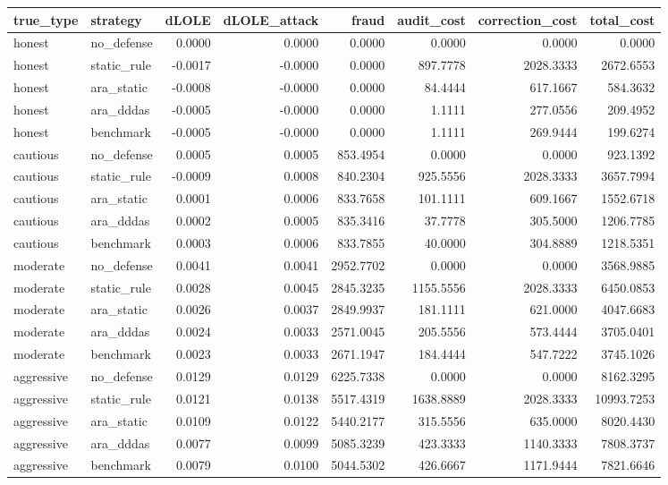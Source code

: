 \begin{tabular}{llrrrrrr}
\toprule
true_type & strategy & dLOLE & dLOLE_attack & fraud & audit_cost & correction_cost & total_cost \\
\midrule
honest & no_defense & 0.0000 & 0.0000 & 0.0000 & 0.0000 & 0.0000 & 0.0000 \\
honest & static_rule & -0.0017 & -0.0000 & 0.0000 & 897.7778 & 2028.3333 & 2672.6553 \\
honest & ara_static & -0.0008 & -0.0000 & 0.0000 & 84.4444 & 617.1667 & 584.3632 \\
honest & ara_dddas & -0.0005 & -0.0000 & 0.0000 & 1.1111 & 277.0556 & 209.4952 \\
honest & benchmark & -0.0005 & -0.0000 & 0.0000 & 1.1111 & 269.9444 & 199.6274 \\
cautious & no_defense & 0.0005 & 0.0005 & 853.4954 & 0.0000 & 0.0000 & 923.1392 \\
cautious & static_rule & -0.0009 & 0.0008 & 840.2304 & 925.5556 & 2028.3333 & 3657.7994 \\
cautious & ara_static & 0.0001 & 0.0006 & 833.7658 & 101.1111 & 609.1667 & 1552.6718 \\
cautious & ara_dddas & 0.0002 & 0.0005 & 835.3416 & 37.7778 & 305.5000 & 1206.7785 \\
cautious & benchmark & 0.0003 & 0.0006 & 833.7855 & 40.0000 & 304.8889 & 1218.5351 \\
moderate & no_defense & 0.0041 & 0.0041 & 2952.7702 & 0.0000 & 0.0000 & 3568.9885 \\
moderate & static_rule & 0.0028 & 0.0045 & 2845.3235 & 1155.5556 & 2028.3333 & 6450.0853 \\
moderate & ara_static & 0.0026 & 0.0037 & 2849.9937 & 181.1111 & 621.0000 & 4047.6683 \\
moderate & ara_dddas & 0.0024 & 0.0033 & 2571.0045 & 205.5556 & 573.4444 & 3705.0401 \\
moderate & benchmark & 0.0023 & 0.0033 & 2671.1947 & 184.4444 & 547.7222 & 3745.1026 \\
aggressive & no_defense & 0.0129 & 0.0129 & 6225.7338 & 0.0000 & 0.0000 & 8162.3295 \\
aggressive & static_rule & 0.0121 & 0.0138 & 5517.4319 & 1638.8889 & 2028.3333 & 10993.7253 \\
aggressive & ara_static & 0.0109 & 0.0122 & 5440.2177 & 315.5556 & 635.0000 & 8020.4430 \\
aggressive & ara_dddas & 0.0077 & 0.0099 & 5085.3239 & 423.3333 & 1140.3333 & 7808.3737 \\
aggressive & benchmark & 0.0079 & 0.0100 & 5044.5302 & 426.6667 & 1171.9444 & 7821.6646 \\
\bottomrule
\end{tabular}

